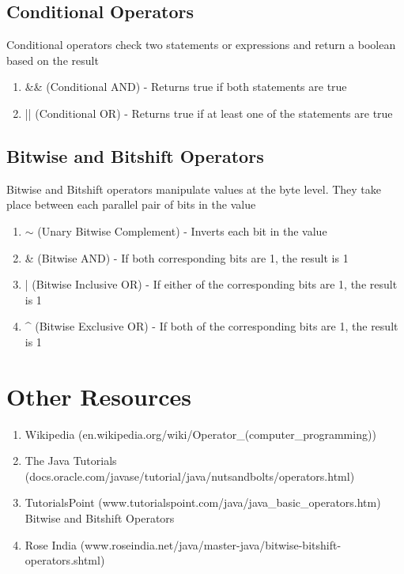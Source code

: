 \documentclass[a4paper]{article}
\begin{document}
\subsection*{Conditional Operators}
Conditional operators check two statements or expressions and return a boolean based on the result
\begin{enumerate}

\item \&\& (Conditional AND) - Returns true if both statements are true

\item || (Conditional OR) - Returns true if at least one of the statements are true

\end{enumerate}

\subsection*{Bitwise and Bitshift Operators}
Bitwise and Bitshift operators manipulate values at the byte level. They take place between each parallel pair of bits in the value
\begin{enumerate}

\item $\sim$ (Unary Bitwise Complement) - Inverts each bit in the value

\item \& (Bitwise AND) - If both corresponding bits are 1, the result is 1

\item | (Bitwise Inclusive OR) - If either of the corresponding bits are 1, the result is 1

\item \string^ (Bitwise Exclusive OR) - If both of the corresponding bits are 1, the result is 1

\end{enumerate}


\newpage

\section*{Other Resources}
\begin{enumerate}

\item Wikipedia (en.wikipedia.org/wiki/Operator\_(computer\_programming))

\item The Java Tutorials (docs.oracle.com/javase/tutorial/java/nutsandbolts/operators.html)

\item TutorialsPoint (www.tutorialspoint.com/java/java\_basic\_operators.htm) \\ 

Bitwise and Bitshift Operators

\item Rose India (www.roseindia.net/java/master-java/bitwise-bitshift-operators.shtml)

\end{enumerate}
\end{document}

